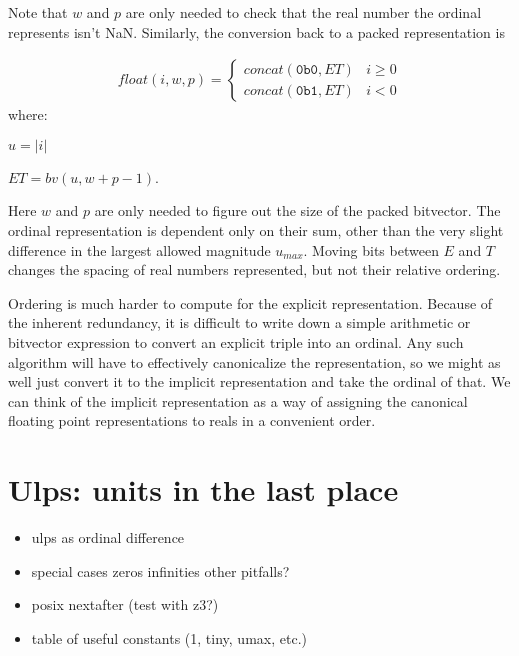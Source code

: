 \documentclass[letterpaper,10pt]{article}
\begin{document}
Note that $w$ and $p$ are only needed to check that the real number the ordinal represents isn't NaN. Similarly, the conversion back to a packed representation is

\begin{align} \label{eq:ord4}
 float(i, w, p) = 
 \begin{cases}
  concat(\texttt{0b0}, ET) & i \geq 0 \\
  concat(\texttt{0b1}, ET) & i < 0
 \end{cases}
\end{align}
where:
\begin{description}
 \item $u = \lvert i \rvert$
 \item $ET = bv(u, w + p - 1)$.
\end{description}

Here $w$ and $p$ are only needed to figure out the size of the packed bitvector. The ordinal representation is dependent only on their sum, other than the very slight difference in the largest allowed magnitude $u_{max}$. Moving bits between $E$ and $T$ changes the spacing of real numbers represented, but not their relative ordering.

Ordering is much harder to compute for the explicit representation. Because of the inherent redundancy, it is difficult to write down a simple arithmetic or bitvector expression to convert an explicit triple into an ordinal. Any such algorithm will have to effectively canonicalize the representation, so we might as well just convert it to the implicit representation and take the ordinal of that. We can think of the implicit representation as a way of assigning the canonical floating point representations to reals in a convenient order.

\section{Ulps: units in the last place}

\begin{itemize}
 \item ulps as ordinal difference
 \item special cases
 \subitem zeros
 \subitem infinities
 \subitem other pitfalls?
 \item posix nextafter (test with z3?)
 \item table of useful constants (1, tiny, umax, etc.)
\end{itemize}
\end{document}
